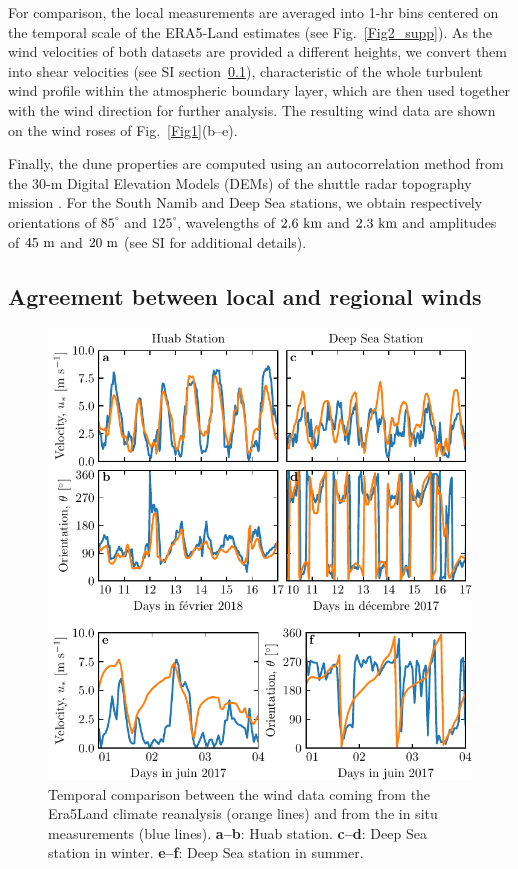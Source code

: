   For comparison, the local measurements are averaged into 1-hr bins centered on the temporal scale of the ERA5-Land estimates (see Fig.~\ref{Fig2_supp}). As the wind velocities of both datasets are provided a different heights, we convert them into shear velocities (see SI section~\ref{}), characteristic of the whole turbulent wind profile within the atmospheric boundary layer, which are then used together with the wind direction for further analysis. The resulting wind data are shown on the wind roses of Fig.~\ref{Fig1}(b--e).

  Finally, the dune properties are computed using an autocorrelation method from the 30-m Digital Elevation Models (DEMs) of the shuttle radar topography mission \citep{Farr2007}. For the South Namib and Deep Sea stations, we obtain respectively orientations of $85^\circ$ and $125^\circ$, wavelengths of $2.6~\textup{km}$ and $2.3~\textup{km}$ and amplitudes of $45~\textup{m}$ and $20~\textup{m}$ (see SI for additional details).

  \subsection{Agreement between local and regional winds}

  \begin{figure}
    \centering
    \includegraphics[scale=1]{Figures/Figure2.pdf}
    \caption{Temporal comparison between the wind data coming from the Era5Land climate reanalysis (orange lines) and from the in situ measurements (blue lines). \textbf{a--b}: Huab station. \textbf{c--d}: Deep Sea station in winter. \textbf{e--f}: Deep Sea station in summer.}
    \label{Fig2}
  \end{figure}

